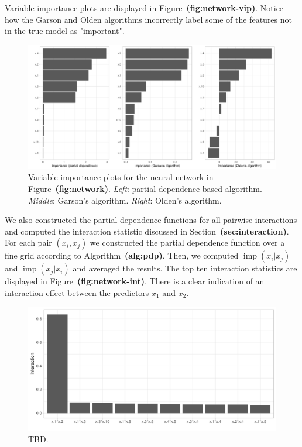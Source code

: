 \documentclass[12pt]{article}
\def\ref#1{\textbf{(#1)}}
\DeclareMathOperator{\imp}{imp}
\begin{document}
Variable importance plots are displayed in Figure~\ref{fig:network-vip}. Notice how the Garson and Olden algorithms incorrectly label some of the features not in the true model as "important".
\begin{figure}[!htb]
  \label{network-vip}
  \centering
  \includegraphics[width=1.0\textwidth]{network-vip}
  \caption{Variable importance plots for the neural network in Figure~\ref{fig:network}. \textit{Left}: partial dependence-based algorithm. \textit{Middle}: Garson's algorithm. \textit{Right}: Olden's algorithm.}
\end{figure}

We also constructed the partial dependence functions for all pairwise interactions and computed the interaction statistic discussed in Section~\ref{sec:interaction}. For each pair $\left(x_i, x_j\right)$ we constructed the partial dependence function over a fine grid according to Algorithm~\ref{alg:pdp}. Then, we computed $\imp\left(x_i | x_j\right)$ and $\imp\left(x_j | x_i\right)$ and averaged the results. The top ten interaction statistics are displayed in Figure~\ref{fig:network-int}. There is a clear indication of an interaction effect between the predictors $x_1$ and $x_2$.
\begin{figure}[!htb]
  \label{network-int}
  \centering
  \includegraphics[width=1.0\textwidth]{network-int}
  \caption{TBD.}
\end{figure}
\end{document}
